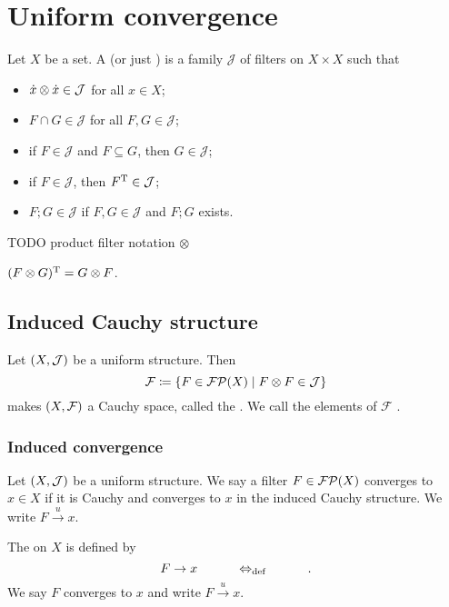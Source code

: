 \section{Uniform convergence}
\begin{definition}
Let $X$ be a set. A  (or just ) is a family $\mathcal{J}$ of filters on $X\times X$ such that
\begin{itemize}
\item $\dot{x}\otimes\dot{x} \in \mathcal{J}$ for all $x\in X$;
\item $F\cap G \in \mathcal{J}$ for all $F,G\in \mathcal{J}$;
\item if $F\in \mathcal{J}$ and $F \subseteq G$, then $G \in \mathcal{J}$;
\item if $F\in \mathcal{J}$, then $F^{\mathrm{T}} \in \mathcal{J}$;
\item $F;G \in \mathcal{J}$ if $F,G\in \mathcal{J}$ and $F;G$ exists.
\end{itemize}
\end{definition}
TODO product filter notation $\otimes$

$(F\otimes G)^{\mathrm{T}} = G\otimes F$.

\subsection{Induced Cauchy structure}
\begin{definition}
Let $\left( X, \mathcal{J} \right)$ be a uniform structure. Then
\[ \mathcal{F} \coloneqq \left\{ F\in \operatorname{\mathcal{FP}}(X) \;\middle|\; F\otimes F \in \mathcal{J} \right\} \]
makes $\left( X, \mathcal{F} \right)$ a Cauchy space, called the . We call the elements of $\mathcal{F}$ .
\end{definition}

\subsubsection{Induced convergence}
\begin{definition}
Let $\left( X, \mathcal{J} \right)$ be a uniform structure. We say a filter $F \in \operatorname{\mathcal{FP}}(X)$ converges  to $x\in X$ if it is Cauchy and converges to $x$ in the induced Cauchy structure. We write $F\overset{u}{\to} x$.

The  on $X$ is defined by
\[ F \to x \qquad \quad\Leftrightarrow_{\text{def}}\quad \qquad . \]
We say $F$ converges  to $x$ and write $F\overset{u}{\to} x$.
\end{definition}

